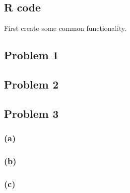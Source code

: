 \begin{appendices}
    \section{R code}

        First create some common functionality.

        \subsection*{Problem 1}

        \subsection*{Problem 2}

        \pagebreak

        \subsection*{Problem 3}

            \subsubsection*{(a)}

            \subsubsection*{(b)}

            \subsubsection*{(c)}

\end{appendices}
